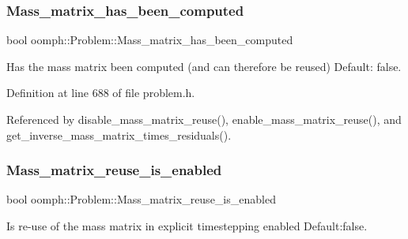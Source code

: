\mbox{\label{classoomph_1_1Problem_a6067c6d344363a073fb8d02a99fb7ed0}} 
\subsubsection{\texorpdfstring{Mass\+\_\+matrix\+\_\+has\+\_\+been\+\_\+computed}{Mass\_matrix\_has\_been\_computed}}
{\footnotesize\ttfamily bool oomph\+::\+Problem\+::\+Mass\+\_\+matrix\+\_\+has\+\_\+been\+\_\+computed\hspace{0.3cm}{\ttfamily [protected]}}



Has the mass matrix been computed (and can therefore be reused) Default\+: false. 



Definition at line 688 of file problem.\+h.



Referenced by disable\+\_\+mass\+\_\+matrix\+\_\+reuse(), enable\+\_\+mass\+\_\+matrix\+\_\+reuse(), and get\+\_\+inverse\+\_\+mass\+\_\+matrix\+\_\+times\+\_\+residuals().

\mbox{\label{classoomph_1_1Problem_af4d25809ac090102a4d4a398e4ad0e26}} 
\subsubsection{\texorpdfstring{Mass\+\_\+matrix\+\_\+reuse\+\_\+is\+\_\+enabled}{Mass\_matrix\_reuse\_is\_enabled}}
{\footnotesize\ttfamily bool oomph\+::\+Problem\+::\+Mass\+\_\+matrix\+\_\+reuse\+\_\+is\+\_\+enabled\hspace{0.3cm}{\ttfamily [protected]}}



Is re-\/use of the mass matrix in explicit timestepping enabled Default\+:false. 



